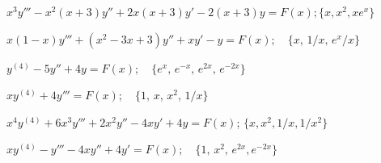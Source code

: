 \begin{exerciselist}
  \item\label{exer:9.4.37} $x^{3}y'''-x^{2}(x+3)y''+2x(x+3)y'-2(x+3)y=F(x);\{x,x^{2},xe^{x}\}$

  \item\label{exer:9.4.38} $x(1-x)y'''+(x^{2}-3x+3)y''+xy'-y=F(x);\quad\{x,\,1/x,\,e^{x}/x\}$

  \item\label{exer:9.4.39} $y^{(4)}-5y''+4y=F(x);\quad\{e^{x},\,e^{-x},\,e^{2x},\,e^{-2x}\}$

  \item\label{exer:9.4.40} $xy^{(4)}+4y'''=F(x);\quad\{1,\,x,\,x^{2},\,1/x\}$

  \item\label{exer:9.4.41} $x^{4}y^{(4)}+6x^{3}y'''+2x^{2}y''-4xy'+4y=F(x)$;\quad
        $\{x,x^{2},1/x,1/x^{2}\}$

  \item\label{exer:9.4.42} $xy^{(4)}-y'''-4xy''+4y'=F(x);\quad\{1,\,x^{2},\,e^{2x},e^{-2x}\}$
\end{exerciselist}
